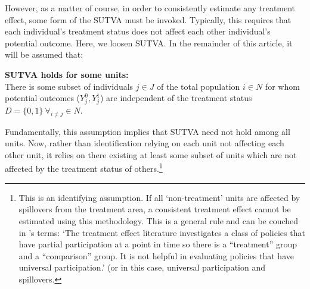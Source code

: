 However, as a matter of course, in order to consistently estimate any treatment 
effect, some form of the SUTVA must be invoked.  Typically, this requires that 
each individual's treatment status does not affect each other individual's 
potential outcome.  Here, we loosen SUTVA. In the remainder of this article, it 
will be assumed that:
\begin{assumption}{3}{}
\label{Sass:SUTVAs}
\textbf{SUTVA holds for some units:} \\
There is some subset of individuals $j\in J$ of the total population $i\in N$ 
for whom potential outcomes ($Y_j^0, Y_j^1$) are independent of the treatment 
status $D=\{0,1\}\ \forall_{i\neq j} \in N$.
\end{assumption}
\vspace{-4mm}
\noindent Fundamentally, this assumption implies that SUTVA need not hold among 
all units.  Now, rather than identification relying on each unit not affecting 
each other unit, it relies on there existing at least some subset of units which 
are not affected by the treatment status of others.\footnote{This is an 
identifying assumption. If all `non-treatment' units are affected by spillovers 
from the treatment area, a consistent treatment effect cannot be estimated using 
this methodology. This is a general rule and can be couched in 
\citet{HeckmanVytlacil2005}'s terms: `The treatment effect literature 
investigates a class of policies that have partial participation at a point in 
time so there is a ``treatment'' group and a ``comparison'' group. It is not 
helpful in evaluating policies that have universal participation.' (or in this 
case, universal participation and spillovers.}


